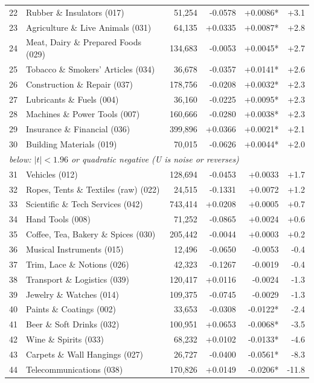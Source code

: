 \begin{tabular}{rlrrrr}
22 & Rubber \& Insulators (017) & 51,254 & -0.0578 & +0.0086* & +3.1 \\
23 & Agriculture \& Live Animals (031) & 64,135 & +0.0335 & +0.0087* & +2.8 \\
24 & Meat, Dairy \& Prepared Foods (029) & 134,683 & -0.0053 & +0.0045* & +2.7 \\
25 & Tobacco \& Smokers' Articles (034) & 36,678 & -0.0357 & +0.0141* & +2.6 \\
26 & Construction \& Repair (037) & 178,756 & -0.0208 & +0.0032* & +2.3 \\
27 & Lubricants \& Fuels (004) & 36,160 & -0.0225 & +0.0095* & +2.3 \\
28 & Machines \& Power Tools (007) & 160,666 & -0.0280 & +0.0038* & +2.3 \\
29 & Insurance \& Financial (036) & 399,896 & +0.0366 & +0.0021* & +2.1 \\
30 & Building Materials (019) & 70,015 & -0.0626 & +0.0044* & +2.0 \\
\midrule
\multicolumn{6}{l}{\textit{below: $|t| < 1.96$ or quadratic negative (U is noise or reverses)}} \\
\midrule
31 & Vehicles (012) & 128,694 & -0.0453 & +0.0033 & +1.7 \\
32 & Ropes, Tents \& Textiles (raw) (022) & 24,515 & -0.1331 & +0.0072 & +1.2 \\
33 & Scientific \& Tech Services (042) & 743,414 & +0.0208 & +0.0005 & +0.7 \\
34 & Hand Tools (008) & 71,252 & -0.0865 & +0.0024 & +0.6 \\
35 & Coffee, Tea, Bakery \& Spices (030) & 205,442 & -0.0044 & +0.0003 & +0.2 \\
36 & Musical Instruments (015) & 12,496 & -0.0650 & -0.0053 & -0.4 \\
37 & Trim, Lace \& Notions (026) & 42,323 & -0.1267 & -0.0019 & -0.4 \\
38 & Transport \& Logistics (039) & 120,417 & +0.0116 & -0.0024 & -1.3 \\
39 & Jewelry \& Watches (014) & 109,375 & -0.0745 & -0.0029 & -1.3 \\
40 & Paints \& Coatings (002) & 33,653 & -0.0308 & -0.0122* & -2.4 \\
41 & Beer \& Soft Drinks (032) & 100,951 & +0.0653 & -0.0068* & -3.5 \\
42 & Wine \& Spirits (033) & 68,232 & +0.0102 & -0.0133* & -4.6 \\
43 & Carpets \& Wall Hangings (027) & 26,727 & -0.0400 & -0.0561* & -8.3 \\
44 & Telecommunications (038) & 170,826 & +0.0149 & -0.0206* & -11.8 \\
\bottomrule
\end{tabular}